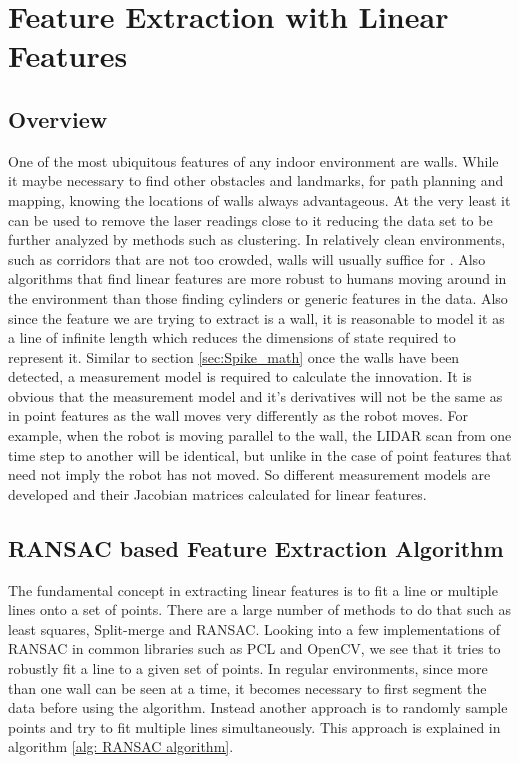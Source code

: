 \section{Feature Extraction with Linear Features}
\label{sec:extraction}
\subsection{Overview}
One of the most ubiquitous features of any indoor environment are walls. While it maybe necessary to find other obstacles and landmarks, for path planning and mapping, knowing the locations of walls always advantageous. At the very least it can be used to remove the laser readings close to it reducing the data set to be further analyzed by methods such as clustering. In relatively clean environments, such as corridors that are not too crowded, walls will usually suffice for \slam. Also algorithms that find linear features are more robust to humans moving around in the environment than those finding cylinders or generic features in the data. Also since the feature we are trying to extract is a wall, it is reasonable to model it as a line of infinite length which reduces the dimensions of state required to represent it. Similar to section \ref{sec:Spike_math} once the walls have been detected, a measurement model is required to calculate the innovation. It is obvious that the measurement model and it's derivatives will not be the same as in point features as the wall moves very differently as the robot moves. For example, when the robot is moving parallel to the wall, the LIDAR scan from one time step to another will be identical, but unlike in the case of point features that need not imply the robot has not moved. So different measurement models are developed and their Jacobian matrices calculated for linear features. 

\subsection{RANSAC based Feature Extraction Algorithm}
\label{sec:ransac}
The fundamental concept in extracting linear features is to fit a line or multiple lines onto a set of points. There are a large number of methods to do that such as least squares, Split-merge and RANSAC\cite{Nguyen2005}. Looking into a few implementations of RANSAC in common libraries such as PCL and OpenCV, we see that it tries to robustly fit a line to a given set of points. In regular environments, since more than one wall can be seen at a time, it becomes necessary to first segment the data before using the algorithm. Instead another approach is to randomly sample points and try to fit multiple lines simultaneously. This approach is explained in algorithm \ref{alg: RANSAC algorithm}\cite{riisgaard2003slam}.

